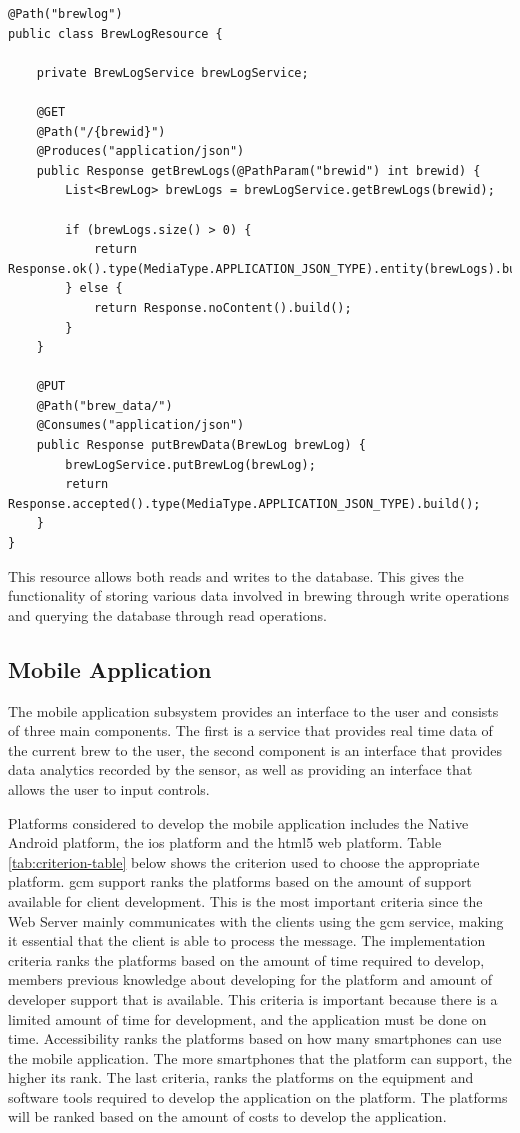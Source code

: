 \documentclass{article}
\begin{document}
\begin{lstlisting}
@Path("brewlog")
public class BrewLogResource {

    private BrewLogService brewLogService;
    
    @GET
    @Path("/{brewid}")
    @Produces("application/json")
    public Response getBrewLogs(@PathParam("brewid") int brewid) {
        List<BrewLog> brewLogs = brewLogService.getBrewLogs(brewid);

        if (brewLogs.size() > 0) {
            return Response.ok().type(MediaType.APPLICATION_JSON_TYPE).entity(brewLogs).build();
        } else {
            return Response.noContent().build();
        }
    }

    @PUT
    @Path("brew_data/")
    @Consumes("application/json")
    public Response putBrewData(BrewLog brewLog) {
        brewLogService.putBrewLog(brewLog);
        return Response.accepted().type(MediaType.APPLICATION_JSON_TYPE).build();
    }
}
\end{lstlisting}

This resource allows both reads and writes to the database. This gives the functionality of storing various data involved in brewing through write operations and querying the database through read operations. 

\subsection{Mobile Application}\label{subsec:mobile-app}
The mobile application subsystem provides an interface to the user and consists of three main components. The first is a service that provides real time data of the current brew to the user, the second component is an interface that provides data analytics recorded by the sensor, as well as providing an interface that allows the user to input controls.


Platforms considered to develop the mobile application includes the Native Android platform, the \gls{ios} platform and the \gls{html5} web platform. Table \ref{tab:criterion-table} below shows the criterion used to choose the appropriate platform. \gls{gcm} support ranks the platforms based on the amount of support available for client development. This is the most important criteria since the Web Server mainly communicates with the clients using the \gls{gcm} service, making it essential that the client is able to process the message. The implementation criteria ranks the platforms based on the amount of time required to develop, members previous knowledge about developing for the platform and amount of developer support that is available. This criteria is important because there is a limited amount of time for development, and the application must be done on time. Accessibility ranks the platforms based on how many smartphones can use the mobile application. The more smartphones that the platform can support, the higher its rank. The last criteria, ranks the platforms on the equipment and software tools required to develop the application on the platform. The platforms will be ranked based on the amount of costs to develop the application.
\end{document}
